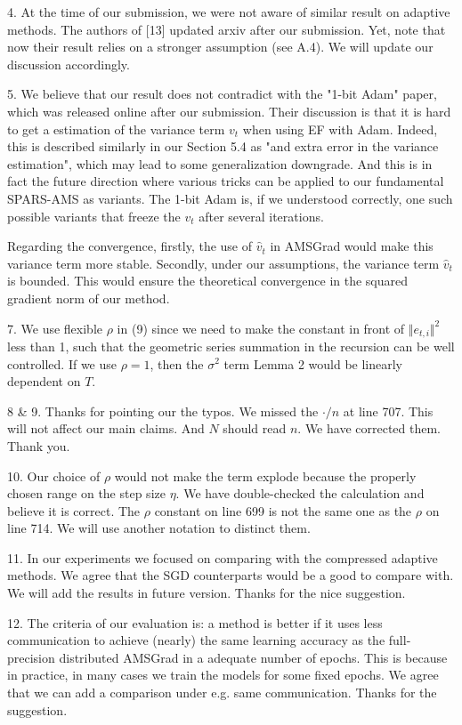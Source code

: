 \documentclass{article}
\begin{document}
4. At the time of our submission, we were not aware of similar result on adaptive methods. The authors of [13] updated arxiv after our submission. Yet, note that now their result relies on a stronger assumption (see A.4). We will update our discussion accordingly.

5. We believe that our result does not contradict with the "1-bit Adam" paper, which was released online after our submission. Their discussion is that it is hard to get a estimation of the variance term $v_t$ when using EF with Adam. Indeed, this is described similarly in our Section 5.4 as "and extra error in the variance estimation", which may lead to some generalization downgrade. And this is in fact the future direction where various tricks can be applied to our fundamental SPARS-AMS as variants. The 1-bit Adam is, if we understood correctly, one such possible variants that freeze the $v_t$ after several iterations. 

Regarding the convergence, firstly, the use of $\hat v_t$ in AMSGrad would make this variance term more stable. Secondly, under our assumptions, the variance term $\hat v_t$ is bounded. This would ensure the theoretical convergence in the squared gradient norm of our method. 

7. We use flexible $\rho$ in (9) since we need to make the constant in front of $\Vert e_{t,i}\Vert^2$ less than 1, such that the geometric series summation in the recursion can be well controlled. If we use $\rho=1$, then the $\sigma^2$ term Lemma 2 would be linearly dependent on $T$.

8 \& 9. Thanks for pointing our the typos. We missed the $\cdot/n$ at line 707. This will not affect our main claims. And $N$ should read $n$. We have corrected them. Thank you.

10. Our choice of $\rho$ would not make the term explode because the properly chosen range on the step size $\eta$. We have double-checked the calculation and believe it is correct. The $\rho$ constant on line 699 is not the same one as the $\rho$ on line 714. We will use another notation to distinct them.

11. In our experiments we focused on comparing with the compressed adaptive methods. We agree that the SGD counterparts would be a good to compare with. We will add the results in future version. Thanks for the nice suggestion.

12. The criteria of our evaluation is: a method is better if it uses less communication to achieve (nearly) the same learning accuracy as the full-precision distributed AMSGrad in a adequate number of epochs. This is because in practice, in many cases we train the models for some fixed epochs. We agree that we can add a comparison under e.g. same communication. Thanks for the suggestion.
\end{document}
